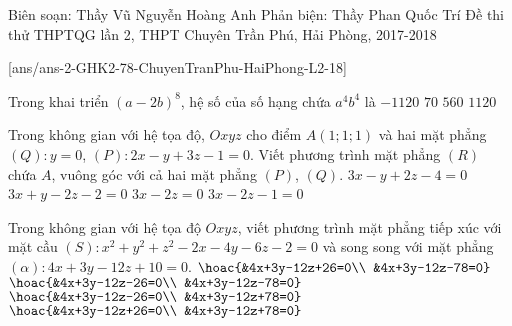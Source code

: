 \begin{name}
{Biên soạn: Thầy Vũ Nguyễn Hoàng Anh \newline Phản biện: Thầy Phan Quốc Trí}
{Đề thi thử THPTQG lần 2, THPT Chuyên Trần Phú, Hải Phòng, 2017-2018}
\end{name}
\setcounter{ex}{0}\setcounter{bt}{0}
[ans/ans-2-GHK2-78-ChuyenTranPhu-HaiPhong-L2-18]

\begin{ex}%
Trong khai triển $(a-2b)^8$, hệ số của số hạng chứa $a^4b^4$ là
\choice
{$-1120$}
{$70$}
{$560$}
{\True $1120$}
\end{ex}

\begin{ex}%
Trong không gian với hệ tọa độ, $Oxyz$ cho điểm $A(1;1;1)$ và hai mặt phẳng $(Q)\colon y=0$, $(P) \colon 2x-y+3z-1=0$. Viết phương trình mặt phẳng $(R)$ chứa $A$, vuông góc với cả hai mặt phẳng $(P)$, $(Q)$.
\choice
{$3x-y+2z-4=0$}
{$3x+y-2z-2=0$}
{$3x-2z=0$}
{\True $3x-2z-1=0$}
\end{ex}

\begin{ex}%
Trong không gian với hệ tọa độ $Oxyz$, viết phương trình mặt phẳng tiếp xúc với mặt cầu $(S)\colon x^2+y^2+z^2-2x-4y-6z-2=0$ và song song với mặt phẳng $(\alpha)\colon 4x+3y-12z+10=0$.
\choice
{$\hoac{&4x+3y-12z+26=0\\ &4x+3y-12z-78=0}$}
{$\hoac{&4x+3y-12z-26=0\\ &4x+3y-12z-78=0}$}
{\True $\hoac{&4x+3y-12z-26=0\\ &4x+3y-12z+78=0}$}
{$\hoac{&4x+3y-12z+26=0\\ &4x+3y-12z+78=0}$}
\end{ex}

